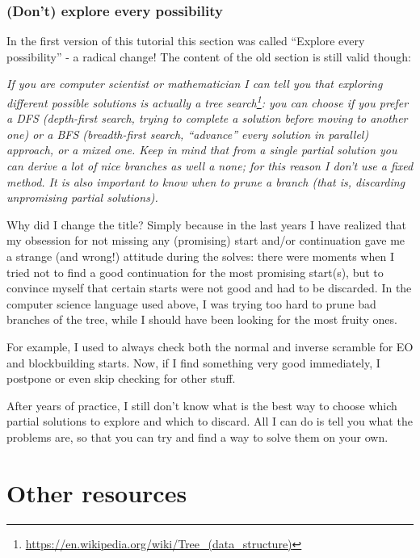 \documentclass[11pt,a4paper]{book}
\begin{document}
\subsection{(Don't) explore every possibility}

In the first version of this tutorial this section was called ``Explore every possibility'' - a radical change! The content of the old section is still valid though:

\bigskip
\emph{If you are computer scientist or mathematician I can tell you that exploring different possible solutions is actually a tree search\footnote{\url{https://en.wikipedia.org/wiki/Tree_(data_structure)}}: you can choose if you prefer a DFS (depth-first search, trying to complete a solution before moving to another one) or a BFS (breadth-first search, “advance” every solution in parallel) approach, or a mixed one. Keep in mind that from a single partial solution you can derive a lot of nice branches as well a none; for this reason I don't use a fixed method. It is also important to know when to prune a branch (that is, discarding unpromising partial solutions).}

\bigskip
Why did I change the title? Simply because in the last years I have realized that my obsession for not missing any (promising) start and/or continuation gave me a strange (and wrong!) attitude during the solves: there were moments when I tried not to find a good continuation for the most promising start(s), but to convince myself that certain starts were not good and had to be discarded. In the computer science language used above, I was trying too hard to prune bad branches of the tree, while I should have been looking for the most fruity ones.

For example, I used to always check both the normal and inverse scramble for EO and blockbuilding starts. Now, if I find something very good immediately, I postpone or even skip checking for other stuff.

After years of practice, I still don't know what is the best way to choose which partial solutions to explore and which to discard. All I can do is tell you what the problems are, so that you can try and find a way to solve them on your own.

\appendix

\chapter{Other resources}
\label{other_sources}
\end{document}
